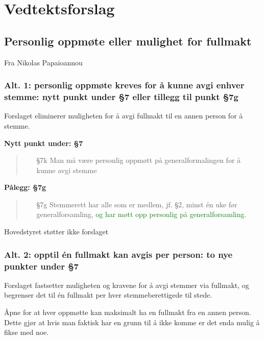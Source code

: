 \documentclass[10pt,norsk,a4paper]{article}
\begin{document}
\newpage

\section{Vedtektsforslag}

\subsection{Personlig oppmøte eller mulighet for fullmakt}
Fra Nikolas Papaioannou

\subsubsection{Alt. 1: personlig oppmøte kreves for å kunne avgi enhver stemme:
               nytt punkt under §7 eller tillegg til punkt §7g}

Forslaget eliminerer muligheten for å avgi fullmakt til en annen person for å stemme.

\textbf{Nytt punkt under: §7}
\begin{quote}
	\begin{enumerate}
		\item[§7k] Man må være personlig oppmøtt på generalformalingen for å kunne avgi stemme
	\end{enumerate}
\end{quote}

\textbf{Pålegg: §7g}
\begin{quote}
    \begin{enumerate}
        \item[§7g] Stemmerett har alle som er medlem, jf. §2, minst én uke før generalforsamling,
                  \textcolor{green}{og har møtt opp personlig på  generalforsamling}.
    \end{enumerate}
\end{quote}

Hovedstyret støtter ikke forslaget


\subsubsection{Alt. 2: opptil én fullmakt kan avgis per person: to nye punkter under §7}

Forslaget fastsetter muligheten og kravene for å avgi stemmer via fullmakt,
og begrenser det til én fullmakt per hver stemmeberettigede til stede.

Åpne for at hver oppmøtte kan maksimalt ha en fullmakt fra en annen person.
Dette gjør at hvis man faktisk har en grunn til å ikke komme er det enda mulig å fikse med noe.
\end{document}

